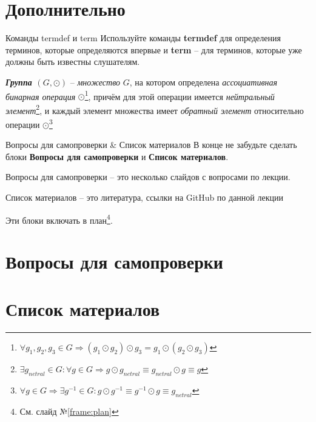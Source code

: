 \documentclass{beamer}
\newcommand{\рис}[1]{рис.\ref{#1}}
\newcommand{\Рис}[1]{Рис.\ref{#1}}
\newcommand{\таблицa}[1]{таблица~№\ref{#1}} %
\newcommand{\таблицы}[1]{таблицы~№\ref{#1}} %
\newcommand{\таблице}[1]{таблице~№\ref{#1}} %
\newcommand{\таблицу}[1]{таблицу~№\ref{#1}} %
\newcommand{\таблицей}[1]{таблицей~№\ref{#1}} %
\newcommand{\Таблицa}[1]{Таблица~№\ref{#1}} %
\newcommand{\Таблицы}[1]{Таблицы~№\ref{#1}} %
\newcommand{\Таблице}[1]{Таблице~№\ref{#1}} %
\newcommand{\Таблицу}[1]{Таблицу~№\ref{#1}} %
\newcommand{\Таблицей}[1]{Таблицей~№\ref{#1}} %
\newcommand{\termdef}[1]{\textbf{\textit{#1}}}
\newcommand{\term}{\textit}
\begin{document}
\section{Дополнительно}\label{section:another}

\begin{frame}{Команды termdef и term}
Используйте команды \textbf{termdef} для определения терминов,
которые определяются впервые и \textbf{term} -- для терминов, которые
уже должны быть известны слушателям.

\termdef{Группа $(G, \odot)$} --  
\term{множество} $G$, 
на котором определена \term{ассоциативная} \term{бинарная операция} $\odot$\footnote{
	$\forall g_1, g_2, g_3 \in G 
	\Rightarrow 
	(g_1 \odot g_2) \odot g_3 = 
	g_1 \odot (g_2 \odot g_3)$
}, 
причём для этой операции имеется \term{нейтральный элемент}\footnote{
	$\exists g_{netral} \in G: 
		\forall g \in G \Rightarrow 
			g  \odot g_{netral} \equiv 
			g_{netral}  \odot g \equiv g$
}, и каждый элемент множества имеет 
\term{обратный элемент} 
относительно операции $\odot$\footnote{
	$\forall g \in G \Rightarrow 
		\exists g^{-1} \in G: 
			g \odot g^{-1} \equiv 
			g^{-1} \odot g \equiv 
			g_{netral} $
}
\end{frame}

\begin{frame}{Вопросы для самопроверки \& Список материалов}
	В конце не забудьте сделать блоки 
	\textbf{Вопросы для самопроверки}
	и 
	\textbf{Список материалов}.
	
	Вопросы для самопроверки -- это несколько слайдов с вопросами по лекции.
	
	Список материалов -- это литература, ссылки на GitHub по данной лекции
	
	Эти блоки  включать в план\footnote{См. слайд №\ref{frame:plan}}.
\end{frame}


\section{Вопросы для самопроверки}


\section{Список материалов}


  
\end{document}

